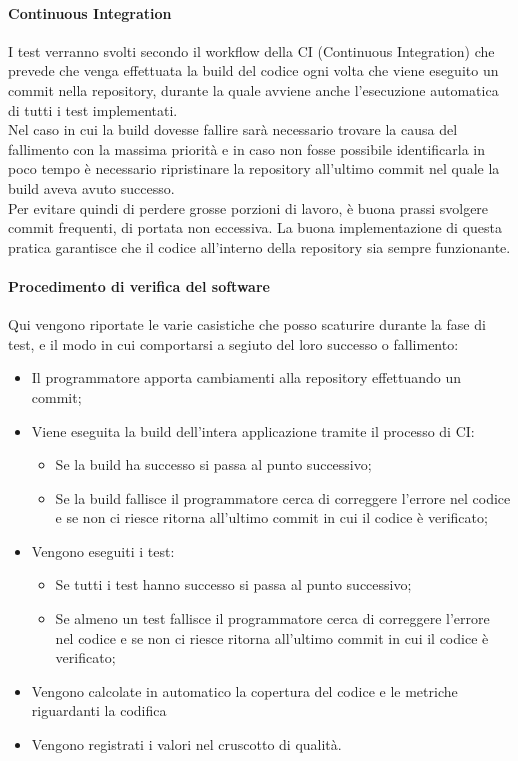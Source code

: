 \paragraph{Continuous Integration}
I test verranno svolti secondo il workflow della CI (Continuous Integration) che prevede che venga effettuata la build del codice ogni volta che viene eseguito un commit nella repository, durante la quale avviene anche l'esecuzione automatica di tutti i test implementati.\\
Nel caso in cui la build dovesse fallire sarà necessario trovare la causa del fallimento con la massima priorità e in caso non fosse possibile identificarla in poco tempo è necessario ripristinare la repository all'ultimo commit nel quale la build aveva avuto successo.\\
Per evitare quindi di perdere grosse porzioni di lavoro, è buona prassi svolgere commit frequenti, di portata non eccessiva.
La buona implementazione di questa pratica garantisce che il codice all'interno della repository sia sempre funzionante.

\paragraph{Procedimento di verifica del software}
Qui vengono riportate le varie casistiche che posso scaturire durante la fase di test, e il modo in cui comportarsi a segiuto del loro successo o fallimento:
\begin{itemize}
	\item Il programmatore apporta cambiamenti alla repository effettuando un commit;
	\item Viene eseguita la build dell'intera applicazione tramite il processo di CI:
		\begin{itemize}
		\item Se la build ha successo si passa al punto successivo;
		\item Se la build fallisce il programmatore cerca di correggere l'errore nel codice e se non ci riesce ritorna all'ultimo commit in cui il codice è verificato;
		\end{itemize}
	\item Vengono eseguiti i test:
		\begin{itemize}
		\item Se tutti i test hanno successo si passa al punto successivo;
		\item Se almeno un test fallisce il programmatore cerca di correggere l'errore nel codice e se non ci riesce ritorna all'ultimo commit in cui il codice è verificato;
		\end{itemize}
	\item Vengono calcolate in automatico la copertura del codice e le metriche riguardanti la codifica
	\item Vengono registrati i valori nel cruscotto di qualità.
\end{itemize}

